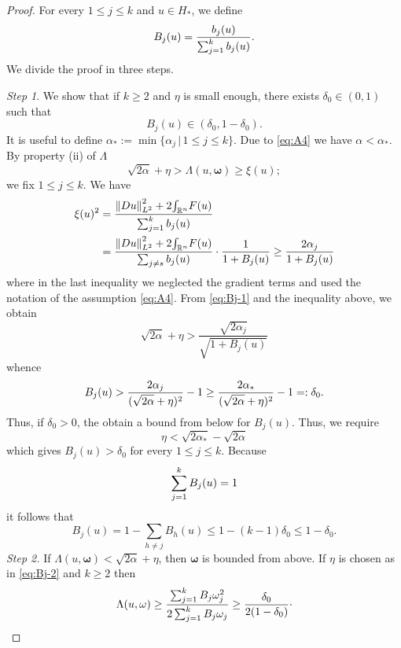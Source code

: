 \documentclass[a4paper,12pt,oneside]{amsart}
\theoremstyle{definition}
\theoremstyle{remark}
\theoremstyle{theorem}
\begin{document}
\begin{proof}
For every $ 1\leq j\leq k $ and $ u\in H_* $, we define
\[
B_j (u) = \frac{b_j (u)}{\sum_{j = 1} \sp k b_j (u)}.
\]
We divide the proof in three steps.

\noindent\textsl{Step 1}. We show that if $ k\geq 2 $ and
$ \eta $ is small enough, there exists $ \delta_0\in (0,1) $ such that 
\begin{equation}
\label{eq:Bj}
B_j (u)\in (\delta_0,1 - \delta_0).
\end{equation}
It is useful to define $ \alpha_* := \min\{\alpha_j\,|\,1\leq j\leq k\} $.
Due to \eqref{eq:A4} we have $ \alpha < \alpha_* $.
By property (ii) of $ \Lambda $
\begin{equation}
\label{eq:Bj-1}
\sqrt{2\alpha} + \eta > \Lambda(u,{\mathbf{\omega}})\geq \xi(u);
\end{equation}
we fix $ 1\leq j\leq k $. We have
\[
\begin{split}
\xi(u)\sp 2 &= \frac{{\|{{D} u}\|}_{L\sp 2} \sp 2 + 2{\int_{{\mathbb{R}}\sp{n}}} {F}(u)}{\sum_{j = 1} \sp k b_j (u)} \\
&= \frac{{\|{{D} u}\|}_{L\sp 2} \sp 2 + 2{\int_{{\mathbb{R}}\sp{n}}} {F}(u)}{\sum_{j\neq s} b_j (u)}\cdot\frac{1}{1 + B_j (u)}
\geq\frac{2\alpha_j}{1 + B_j (u)}
\end{split}
\]
where in the last inequality we neglected the gradient terms and used the 
notation of the assumption \eqref{eq:A4}.
From \eqref{eq:Bj-1} and the inequality above, we obtain
\[
\sqrt{2\alpha} + \eta > \frac{\sqrt{2\alpha_j}}{\sqrt{1 + B_j (u)}}
\]
whence
\begin{equation}
\label{eq:Bj-3}
B_j (u) > \frac{2\alpha_j}{(\sqrt{2\alpha} + \eta)\sp 2} - 1 \geq
\frac{2\alpha_*}{(\sqrt{2\alpha} + \eta)\sp 2} - 1 =:  \delta_0.
\end{equation}
Thus, if $ \delta_0 > 0 $, the obtain a bound from below for $ B_j (u) $.
Thus, we require
\begin{equation}
\label{eq:Bj-2}
\eta < \sqrt{2\alpha_*} - \sqrt{2\alpha}
\end{equation}
which gives $ B_j (u) > \delta_0 $ for every $ 1\leq j\leq k $. 
Because 
\[
\sum_{j = 1} \sp k B_j (u) = 1
\]
it follows that
\[
B_j (u) = 1 - \sum_{h\neq j} B_h (u)\leq 1 - (k - 1)\delta_0\leq 1 - \delta_0.
\]
\textsl{Step 2.}
If $ \Lambda(u,{\mathbf{\omega}}) < \sqrt{2\alpha} + \eta $, then $ {\mathbf{\omega}} $
is bounded from above. If $ \eta $ is chosen as in \eqref{eq:Bj-2}
and $ k\geq 2 $ then 
\[
\Lambda(u,{\mathbf{\omega}})\geq\frac{\sum_{j = 1} \sp k B_j {\mathbf{\omega}}_j\sp 2}{2\sum_{j = 1} \sp k B_j {\mathbf{\omega}}_j}\geq \frac{\delta_0}{2(1 - \delta_0)}\cdot
\]
\end{proof}
\end{document}
